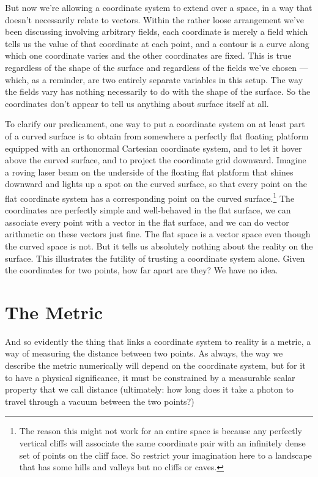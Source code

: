 But now we're allowing a coordinate system to extend over a space, in a way that doesn't necessarily relate to vectors. Within the rather loose arrangement we've been discussing involving arbitrary fields, each coordinate is merely a field which tells us the value of that coordinate at each point, and a contour is a curve along which one coordinate varies and the other coordinates are fixed. This is true regardless of the shape of the surface and regardless of the fields we've chosen --- which, as a reminder, are two entirely separate variables in this setup. The way the fields vary has nothing necessarily to do with the shape of the surface. So the coordinates don't appear to tell us anything about surface itself at all.

To clarify our predicament, one way to put a coordinate system on at least part of a curved surface is to obtain from somewhere a perfectly flat floating platform equipped with an orthonormal Cartesian coordinate system, and to let it hover above the curved surface, and to project the coordinate grid downward. Imagine a roving laser beam on the underside of the floating flat platform that shines downward and lights up a spot on the curved surface, so that every point on the flat coordinate system has a corresponding point on the curved surface.\footnote{The reason this might not work for an entire space is because any perfectly vertical cliffs will associate the same coordinate pair with an infinitely dense set of points on the cliff face. So restrict your imagination here to a landscape that has some hills and valleys but no cliffs or caves.} The coordinates are perfectly simple and well-behaved in the flat surface, we can associate every point with a vector in the flat surface, and we can do vector arithmetic on these vectors just fine. The flat space is a vector space even though the curved space is not. But it tells us absolutely nothing about the reality on the surface. This illustrates the futility of trusting a coordinate system alone. Given the coordinates for two points, how far apart are they? We have no idea.

\section{The Metric}

And so evidently the thing that links a coordinate system to reality is a metric, a way of measuring the distance between two points. As always, the way we describe the metric numerically will depend on the coordinate system, but for it to have a physical significance, it must be constrained by a measurable scalar property that we call distance (ultimately: how long does it take a photon to travel through a vacuum between the two points?)

